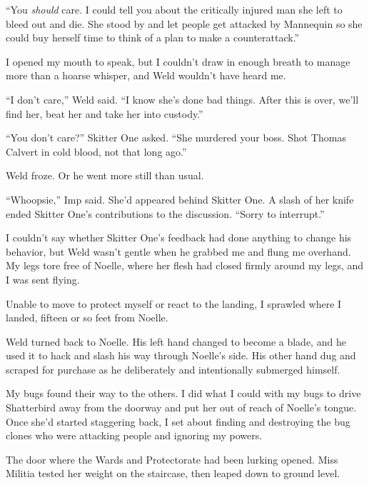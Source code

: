 ``You \emph{should }care.  I could tell you about the critically injured man she left to bleed out and die.  She stood by and let people get attacked by Mannequin so she could buy herself time to think of a plan to make a counterattack.''



I opened my mouth to speak, but I couldn't draw in enough breath to manage more than a hoarse whisper, and Weld wouldn't have heard me.



``I don't care,'' Weld said.  ``I know she's done bad things.  After this is over, we'll find her, beat her and take her into custody.''



``You don't care?'' Skitter One asked.  ``She murdered your boss.  Shot Thomas Calvert in cold blood, not that long ago.''



Weld froze.  Or he went more still than usual.



``Whoopsie,'' Imp said.  She'd appeared behind Skitter One.  A slash of her knife ended Skitter One's contributions to the discussion.  ``Sorry to interrupt.''



I couldn't say whether Skitter One's feedback had done anything to change his behavior, but Weld wasn't gentle when he grabbed me and flung me overhand.  My legs tore free of Noelle, where her flesh had closed firmly around my legs, and I was sent flying.



Unable to move to protect myself or react to the landing, I sprawled where I landed, fifteen or so feet from Noelle.



Weld turned back to Noelle.  His left hand changed to become a blade, and he used it to hack and slash his way through Noelle's side.  His other hand dug and scraped for purchase as he deliberately and intentionally submerged himself.



My bugs found their way to the others.  I did what I could with my bugs to drive Shatterbird away from the doorway and put her out of reach of Noelle's tongue.  Once she'd started staggering back, I set about finding and destroying the bug clones who were attacking people and ignoring my powers.



The door where the Wards and Protectorate had been lurking opened.  Miss Militia tested her weight on the staircase, then leaped down to ground level.



